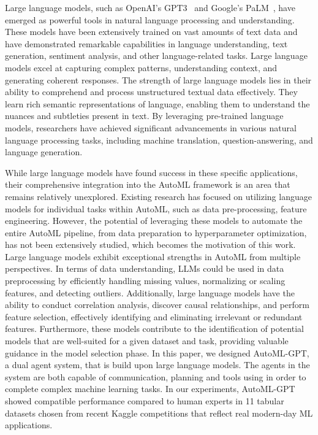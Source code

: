 \documentclass{article}
\theoremstyle{plain}
\theoremstyle{definition}
\theoremstyle{remark}
\begin{document}
Large language models, such as OpenAI's GPT3~\cite{GPT3} and Google's PaLM~\cite{chowdhery2022palm}, have emerged as powerful tools in natural language processing and understanding. These models have been extensively trained on vast amounts of text data and have demonstrated remarkable capabilities in language understanding, text generation, sentiment analysis, and other language-related tasks. Large language models excel at capturing complex patterns, understanding context, and generating coherent responses.
The strength of large language models lies in their ability to comprehend and process unstructured textual data effectively. They learn rich semantic representations of language, enabling them to understand the nuances and subtleties present in text. By leveraging pre-trained language models, researchers have achieved significant advancements in various natural language processing tasks, including machine translation, question-answering, and language generation.

While large language models have found success in these specific applications, their comprehensive integration into the AutoML framework is an area that remains relatively unexplored. Existing research has focused on utilizing language models for individual tasks within AutoML, such as data pre-processing, feature engineering. However, the potential of leveraging these models to automate the entire AutoML pipeline, from data preparation to hyperparameter optimization, has not been extensively studied, which becomes the motivation of this work. 
Large language models exhibit exceptional strengths in AutoML from multiple perspectives. In terms of data understanding, LLMs could be used in data preprocessing by efficiently handling missing values, normalizing or scaling features, and detecting outliers. Additionally, large language models have the ability to conduct correlation analysis, discover causal relationships, and perform feature selection, effectively identifying and eliminating irrelevant or redundant features. Furthermore, these models contribute to the identification of potential models that are well-suited for a given dataset and task, providing valuable guidance in the model selection phase. In this paper, we designed AutoML-GPT, a dual agent system, that is build upon large language models. The agents in the system are both capable of communication, planning and tools using in order to complete complex machine learning tasks. In our experiments, AutoML-GPT showed compatible performance compared to human experts in  11 tabular datasets chosen from recent Kaggle competitions that reflect real modern-day ML applications.
\end{document}
